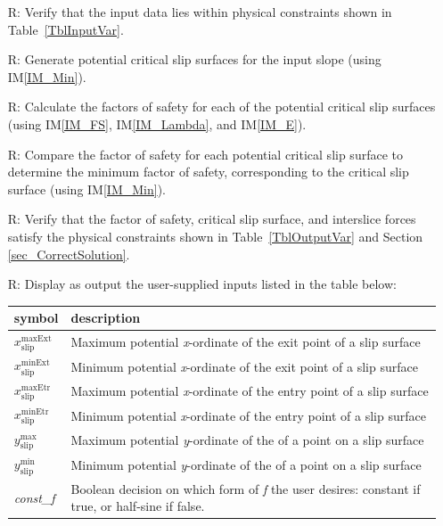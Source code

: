 \documentclass[12pt]{article}
\renewcommand{\arraystretch}{1}
\newcommand{\iref}[1]{IM\ref{#1}}
\newcounter{reqnum} %
\begin{document}
\begin{itemize}
\item[R\refstepcounter{reqnum}\thereqnum \label{R_VerifyInput}:] Verify that 
the 
input data lies within physical constraints shown in Table~\ref{TblInputVar}.

\item[R\refstepcounter{reqnum}\thereqnum \label{R_InitGen}:] Generate
potential critical slip surfaces for the input slope (using \iref{IM_Min}). 

\item[R\refstepcounter{reqnum}\thereqnum \label{R_FS}:] Calculate the
  factors of safety for each of the potential critical slip surfaces (using 
  \iref{IM_FS}, \iref{IM_Lambda}, and \iref{IM_E}).

\item[R\refstepcounter{reqnum}\thereqnum \label{R_Minimize}:] Compare the 
factor of safety for each potential critical slip surface to determine the 
minimum factor of safety, corresponding to the critical slip surface (using 
\iref{IM_Min}).

\item[R\refstepcounter{reqnum}\thereqnum \label{R_VerifyOutput}:] Verify that 
the factor of safety, critical slip surface, and interslice forces satisfy the 
physical constraints shown in Table~\ref{TblOutputVar} and Section
\ref{sec_CorrectSolution}.

\item[R\refstepcounter{reqnum}\thereqnum \label{R_OutputInputs}:] Display as 
output the user-supplied inputs listed in the table below:
\begin{table}[!h]
	\renewcommand{\arraystretch}{1.5}
	\noindent \begin{tabularx}{1.0\textwidth}{l X} \toprule \textbf{symbol} &
		\textbf{description}\\ \midrule
		${x_{\text{slip}}^{\text{maxExt}}}$ & Maximum potential 
		\textit{x}-ordinate of 
		the exit point of a slip surface \\
		${x_{\text{slip}}^{\text{minExt}}}$ & Minimum potential 
		\textit{x}-ordinate of 
		the exit point of a slip surface\\
		${x_{\text{slip}}^{\text{maxEtr}}}$ & Maximum potential 
		\textit{x}-ordinate 
		of 
		the entry point of a slip surface \\
		${x_{\text{slip}}^{\text{minEtr}}}$ & Minimum potential 
		\textit{x}-ordinate 
		of 
		the entry point of a slip surface \\
		${y_{\text{slip}}^{\text{max}}}$ & Maximum potential 
		\textit{y}-ordinate of 
		the 
		of a point on a slip surface\\
		${y_{\text{slip}}^{\text{min}}}$ & Minimum potential 
		\textit{y}-ordinate of 
		the 
		of a point on a slip surface \\
		\textit{const\_f} & Boolean decision on which form of \textit{f} 
		the user desires: constant if true, or half-sine if false.\\ 
		\bottomrule
	\end{tabularx}
\end{table}


\end{itemize}
\end{document}
